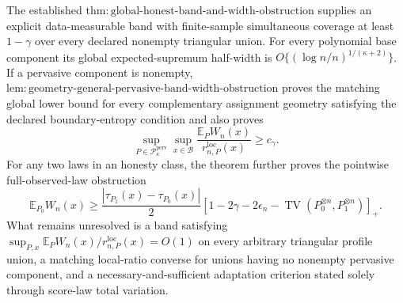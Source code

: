 The established \(\mathrm{thm:global\text{-}honest\text{-}band\text{-}and\text{-}width\text{-}obstruction}\) supplies an explicit data-measurable band with finite-sample simultaneous coverage at least \(1-\gamma\) over every declared nonempty triangular union.  For every polynomial base component its global expected-supremum half-width is \(O\{(\log n/n)^{1/(\kappa+2)}\}\).  If a pervasive component is nonempty, \(\mathrm{lem:geometry\text{-}general\text{-}pervasive\text{-}band\text{-}width\text{-}obstruction}\) proves the matching global lower bound for every complementary assignment geometry satisfying the declared boundary-entropy condition and also proves
\[
 \sup_{P\in\mathcal P_\kappa^{\mathrm{perv}}}\sup_{x\in\mathcal B}
 \frac{\mathbb E_PW_n(x)}{r_{n,P}^{\mathrm{loc}}(x)}\ge c_\gamma.
\]
For any two laws in an honesty class, the theorem further proves the pointwise full-observed-law obstruction
\[
 \mathbb E_{P_0}W_n(x)\ge
 \frac{|\tau_{P_1}(x)-\tau_{P_0}(x)|}{2}
 \left[1-2\gamma-2\epsilon_n-\operatorname{TV}(P_0^{\otimes n},P_1^{\otimes n})\right]_+.
\]
What remains unresolved is a band satisfying \(\sup_{P,x}\mathbb E_PW_n(x)/r_{n,P}^{\mathrm{loc}}(x)=O(1)\) on every arbitrary triangular profile union, a matching local-ratio converse for unions having no nonempty pervasive component, and a necessary-and-sufficient adaptation criterion stated solely through score-law total variation.